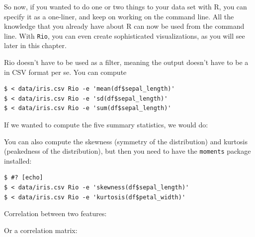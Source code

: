 \documentclass[
]{book}
\newenvironment{Shaded}{\begin{snugshade}}{\end{snugshade}}
\newcommand{\ExtensionTok}[1]{#1}
\newcommand{\NormalTok}[1]{#1}
\newcommand{\OperatorTok}[1]{\textcolor[rgb]{0.81,0.36,0.00}{\textbf{#1}}}
\newcommand{\StringTok}[1]{\textcolor[rgb]{0.31,0.60,0.02}{#1}}
\theoremstyle{definition}
\theoremstyle{definition}
\theoremstyle{definition}
\theoremstyle{remark}
\begin{document}
So now, if you wanted to do one or two things to your data set with R, you can specify it as a one-liner, and keep on working on the command line. All the knowledge that you already have about R can now be used from the command line. With \texttt{Rio}, you can even create sophisticated visualizations, as you will see later in this chapter.

Rio doesn't have to be used as a filter, meaning the output doesn't have to be a in CSV format per se. You can compute

\begin{verbatim}
$ < data/iris.csv Rio -e 'mean(df$sepal_length)'
$ < data/iris.csv Rio -e 'sd(df$sepal_length)'
$ < data/iris.csv Rio -e 'sum(df$sepal_length)'
\end{verbatim}

If we wanted to compute the five summary statistics, we would do:

\begin{Shaded}
\end{Shaded}

You can also compute the skewness (symmetry of the distribution) and kurtosis (peakedness of the distribution), but then you need to have the \texttt{moments} package installed:

\begin{verbatim}
$ #? [echo]
$ < data/iris.csv Rio -e 'skewness(df$sepal_length)'
$ < data/iris.csv Rio -e 'kurtosis(df$petal_width)'
\end{verbatim}

Correlation between two features:

\begin{Shaded}
\end{Shaded}

Or a correlation matrix:
\end{document}
